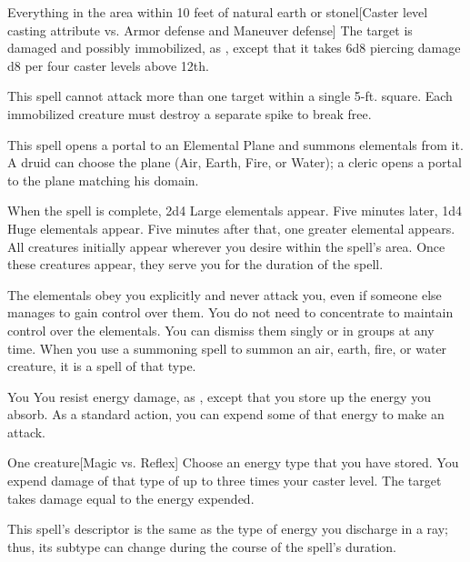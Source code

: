 \spellrng{\rngmed}
\begin{spelltargets}{Everything in the area within 10 feet of natural earth or stone}l[Caster level \add casting attribute vs. Armor defense and Maneuver defense]
    \spellsuccess The target is damaged and possibly immobilized, as , except that it takes 6d8 piercing damage \add d8 per four caster levels above 12th.
\end{spelltargets}
\spellnotes This spell cannot attack more than one target within a single 5-ft. square. Each immobilized creature must destroy a separate spike to break free.

\spelldur{\durlong \dismissable}
\spellline
\spelleffect This spell opens a portal to an Elemental Plane and summons elementals from it. A druid can choose the plane (Air, Earth, Fire, or Water); a cleric opens a portal to the plane matching his domain.
\par When the spell is complete, 2d4 Large elementals appear. Five minutes later, 1d4 Huge elementals appear. Five minutes after that, one greater elemental appears. All creatures initially appear wherever you desire within the spell's area. Once these creatures appear, they serve you for the duration of the spell.
\par The elementals obey you explicitly and never attack you, even if someone else manages to gain control over them. You do not need to concentrate to maintain control over the elementals. You can dismiss them singly or in groups at any time.
\spellnotes When you use a summoning spell to summon an air, earth, fire, or water creature, it is a spell of that type.

\begin{spelltarget}{You}
    \spelleffect You resist energy damage, as , except that you store up the energy you absorb. As a standard action, you can expend some of that energy to make an attack.
\end{spelltarget}
\spellrng{\rngclose}
\begin{spelltarget}{One creature}[Magic vs. Reflex]
    \spelleffect Choose an energy type that you have stored. You expend damage of that type of up to three times your caster level.
    \spellsuccess The target takes damage equal to the energy expended.
\end{spelltarget}
\spellnotes This spell's descriptor is the same as the type of energy you discharge in a ray; thus, its subtype can change during the course of the spell's duration.

